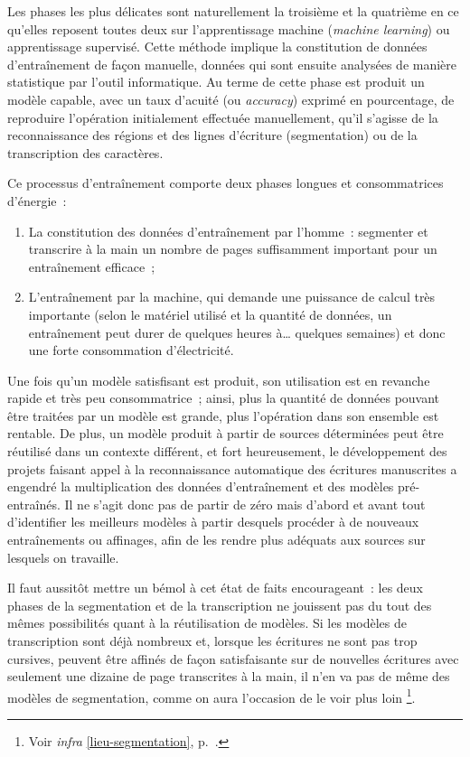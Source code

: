 \documentclass[a4paper,12pt,twoside]{book}
\begin{document}
			Les phases les plus délicates sont naturellement la troisième et la quatrième en ce qu'elles reposent toutes deux sur l'apprentissage machine (\textit{machine learning}) ou apprentissage supervisé. Cette méthode implique la constitution de données d'entraînement de façon manuelle, données qui sont ensuite analysées de manière statistique par l'outil informatique. Au terme de cette phase est produit un modèle capable, avec un taux d'acuité (ou \textit{accuracy}) exprimé en pourcentage, de reproduire l'opération initialement effectuée manuellement, qu'il s'agisse de la reconnaissance des régions et des lignes d'écriture (\gls{segmentation}) ou de la transcription des caractères.
			
			Ce processus d'entraînement comporte deux phases longues et consommatrices d'énergie~:
			
			\begin{enumerate}
				\item La constitution des données d'entraînement par l'homme~: segmenter et transcrire à la main un nombre de pages suffisamment important pour un entraînement efficace~;
				\item L'entraînement par la machine, qui demande une puissance de calcul très importante (selon le matériel utilisé et la quantité de données, un entraînement peut durer de quelques heures à… quelques semaines) et donc une forte consommation d'électricité.
			\end{enumerate}
			
			Une fois qu'un modèle satisfisant est produit, son utilisation est en revanche rapide et très peu consommatrice~; ainsi, plus la quantité de données pouvant être traitées par un modèle est grande, plus l'opération dans son ensemble est rentable. De plus, un modèle produit à partir de sources déterminées peut être réutilisé dans un contexte différent, et fort heureusement, le développement des projets faisant appel à la reconnaissance automatique des écritures manuscrites a engendré la multiplication des données d'entraînement et des modèles pré-entraînés. Il ne s'agit donc pas de partir de zéro mais d'abord et avant tout d'identifier les meilleurs modèles à partir desquels procéder à de nouveaux entraînements ou affinages, afin de les rendre plus adéquats aux sources sur lesquels on travaille.
			
			Il faut aussitôt mettre un bémol à cet état de faits encourageant~: les deux phases de la \gls{segmentation} et de la transcription ne jouissent pas du tout des mêmes possibilités quant à la réutilisation de modèles. Si les modèles de transcription sont déjà nombreux et, lorsque les écritures ne sont pas trop cursives, peuvent être affinés de façon satisfaisante sur de nouvelles écritures avec seulement une dizaine de page transcrites à la main, il n'en va pas de même des modèles de \gls{segmentation}, comme on aura l'occasion de le voir plus loin
			\footnote{Voir \textit{infra} \ref{lieu-segmentation}, p.~\pageref{lieu-segmentation}.}.
		
\end{document}
